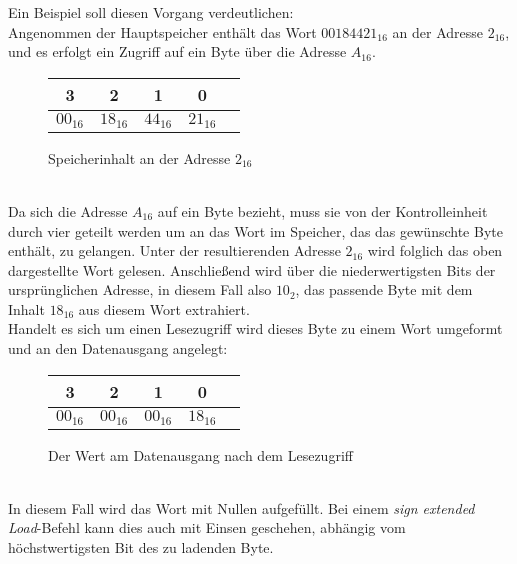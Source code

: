 Ein Beispiel soll diesen Vorgang verdeutlichen:\\
Angenommen der Hauptspeicher enthält das Wort $00184421_{16}$ an der Adresse $2_{16}$,
und es erfolgt ein Zugriff auf ein Byte über die Adresse $A_{16}$.
\begin{figure} [htpb]
    \centering
        \begin{tabular}{|c|c|c|c|c|}
            \multicolumn{1}{c}{3} & \multicolumn{1}{c}{2} &  \multicolumn{1}{c}{1}& \multicolumn{1}{c}{0}\\
            \hline
            $00_{16}$ & $18_{16}$ & $44_{16}$ & $21_{16}$\\
            \hline
        \end{tabular}
        \caption{Speicherinhalt an der Adresse $2_{16}$}
\end{figure}
\\                                                        
Da sich die Adresse $A_{16}$ auf ein Byte bezieht, muss sie von der Kontrolleinheit durch vier geteilt werden um an das Wort im Speicher, das das gewünschte Byte enthält, zu gelangen.
Unter der resultierenden Adresse $2_{16}$ wird folglich das oben dargestellte Wort gelesen.
Anschließend wird über die niederwertigsten Bits der ursprünglichen Adresse, in diesem Fall also $10_2$, das passende Byte mit dem Inhalt $18_{16}$ aus diesem Wort extrahiert.\\
Handelt es sich um einen Lesezugriff wird dieses Byte zu einem Wort umgeformt und an den Datenausgang angelegt:\\
\begin{figure} [htpb]
    \centering
        \begin{tabular}{|c|c|c|c|c|}
            \multicolumn{1}{c}{3} & \multicolumn{1}{c}{2} &  \multicolumn{1}{c}{1}& \multicolumn{1}{c}{0}\\
            \hline
            $00_{16}$ & $00_{16}$ & $00_{16}$ & $18_{16}$\\
            \hline
        \end{tabular}
        \caption{Der Wert am Datenausgang nach dem Lesezugriff}
\end{figure}\\
In diesem Fall wird das Wort mit Nullen aufgefüllt. 
Bei einem \textit{sign extended Load}-Befehl kann dies auch mit Einsen geschehen, abhängig vom höchstwertigsten Bit des zu ladenden Byte.

